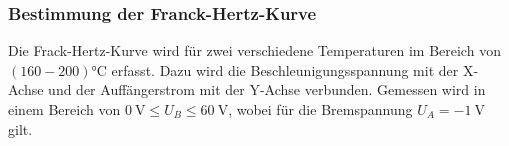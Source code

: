 
\subsubsection*{Bestimmung der Franck-Hertz-Kurve}
Die Frack-Hertz-Kurve wird für zwei verschiedene Temperaturen im Bereich von $(\num{160}-\num{200})\si{\celsius}$ erfasst. Dazu wird die
Beschleunigungsspannung mit der X-Achse und der Auffängerstrom mit der Y-Achse verbunden. Gemessen wird in einem Bereich von
$\SI{0}{\volt} \leq U_B \leq \SI{60}{\volt}$, wobei für die Bremspannung $U_A=\SI{-1}{\volt}$ gilt.
